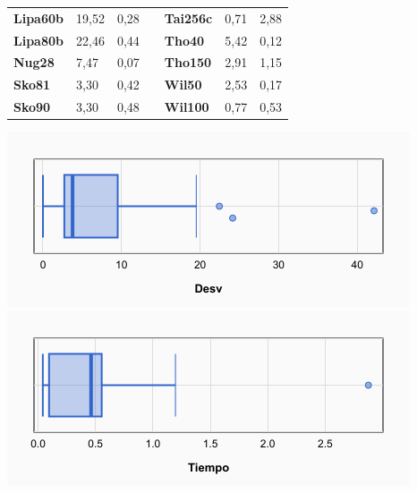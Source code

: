 \documentclass[a4paper, 12pt]{article}
\begin{document}
\begin{table}[H]
\begin{tabular}{|l|l|l|l|l|l|l|}
\textbf{Lipa60b}                    & 19,52                              & 0,28                                 &                                & \textbf{Tai256c}                   & 0,71                               & 2,88                                 \\ \cline{1-3} \cline{5-7} 
\textbf{Lipa80b}                    & 22,46                              & 0,44                                 &                                & \textbf{Tho40}                     & 5,42                               & 0,12                                 \\ \cline{1-3} \cline{5-7} 
\textbf{Nug28}                      & 7,47                               & 0,07                                 &                                & \textbf{Tho150}                    & 2,91                               & 1,15                                 \\ \cline{1-3} \cline{5-7} 
\textbf{Sko81}                      & 3,30                               & 0,42                                 &                                & \textbf{Wil50}                     & 2,53                               & 0,17                                 \\ \cline{1-3} \cline{5-7} 
\textbf{Sko90}                      & 3,30                               & 0,48                                 &                                & \textbf{Wil100}                    & 0,77                               & 0,53                                 \\ \cline{1-3} \cline{5-7} 
\end{tabular}
\end{table}

\begin{center}
         \includegraphics[scale=0.42]{boxplot-am(1-01)-desv}
         \includegraphics[scale=0.42]{boxplot-am(1-01)-time}
      \end{center}
      
\end{document}
